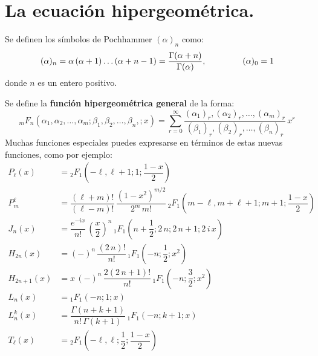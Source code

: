 \section{La ecuación hipergeométrica.}
Se definen los símbolos de Pochhammer $(\alpha)_{n}$ como:
\[ (\alpha)_{n} = \alpha \, (\alpha + 1) \ldots (\alpha + n -1) = \dfrac{\Gamma (\alpha + n)}{\Gamma (\alpha)}, \hspace{1.5cm} (\alpha)_{0} = 1 \]
donde $n$ es un entero positivo.
\par
Se define la \textbf{función hipergeométrica general} de la forma:
\begin{equation}
{}_{m}F_{n} (\alpha_{1}, \alpha_{2}, \ldots, \alpha_{m}; \beta_{1}, \beta_{2}, \ldots, \beta_{n},; x) = \sum_{r=0}^{\infty} \dfrac{(\alpha_{1})_{r}, (\alpha_{2})_{r}, \ldots, (\alpha_{m})_{r}}{(\beta_{1})_{r}, (\beta_{2})_{r}, \ldots, (\beta_{n})_{r}} \, x^{r}
\label{eq:ecuacion_08_91}
\end{equation}
Muchas funciones especiales puedes expresarse en términos de estas nuevas funciones, como por ejemplo:
\begin{align*}
P_{\ell} (x) &= {}_{2}F_{1} \left( -\ell , \ell + 1; 1; \dfrac{1 - x}{2} \right) \\[1em]
P_{m}^{\ell} &= \dfrac{(\ell + m)!}{(\ell - m)!} \, \dfrac{(1 - x^{2})^{m/2}}{2^{m} \, m!} \, {}_{2}F_{1} \left( m - \ell, m + \ell + 1; m + 1; \dfrac{1 - x}{2} \right) \\[1em]
J_{n} (x) &= \dfrac{e^{-i x}}{n!} \, \left( \dfrac{x}{2} \right)^{n} \, {}_1 F_{1} \left( n + \dfrac{1}{2}; 2 \, n; 2 \, n + 1; 2 \, i \, x \right) \\[1em]
H_{2 n} (x) &= (-)^{n} \, \dfrac{(2 \, n)!}{n!} \, {}_1 F_{1} \left( -n; \dfrac{1}{2}; x^{2} \right) \\[1em]
H_{2 n+1} (x) &= x \, (-)^{n} \, \dfrac{2 (2 \, n + 1)!}{n!} \, {}_1 F_{1} \left( -n; \dfrac{3}{2}; x^{2}\right) \\[1em]
L_{n} (x) &= {}_{1} F_{1} (-n; 1; x)\\[1em]
L_{n}^{k} (x) &= \dfrac{\Gamma (n +  k + 1)}{n! \, \Gamma (k + 1)} \, {}_{1} F_{1} (-n; k + 1; x) \\[1em]
T_{\ell} (x) &= {}_{2} F_{1} \left( -\ell, \ell; \dfrac{1}{2}; \dfrac{1 - x}{2} \right)
\end{align*}

